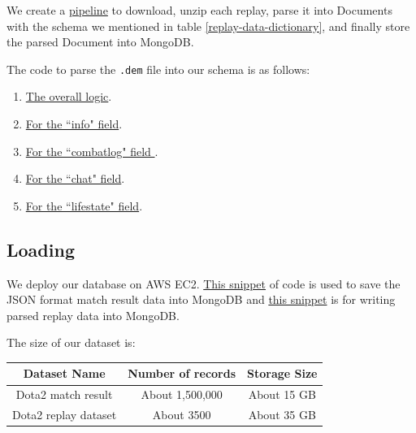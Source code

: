 \documentclass{article}
\newcommand{\codeinline}[1]{
    \texttt{#1}
}
\begin{document}
We create a \href{https://github.com/Vopaaz/big-data-psg-lgd/blob/9916e0a5a95245062d110446eb4014312087ef9e/src/main/java/FetchStore/ValveAPI.java#L389-L418}{pipeline} to download, unzip each replay, parse it into Documents with the schema we mentioned in table \ref{replay-data-dictionary}, and finally store the parsed Document into MongoDB.

The code to parse the \codeinline{.dem} file into our schema is as follows:

\begin{enumerate}
\item \href{https://github.com/Vopaaz/big-data-psg-lgd/blob/master/src/main/java/ParseReplay/ParseReplayExecutor.java}{The overall logic}.
\item \href{https://github.com/Vopaaz/big-data-psg-lgd/blob/master/src/main/java/ParseReplay/Info.java}{For the ``info" field}.
\item \href{https://github.com/Vopaaz/big-data-psg-lgd/blob/master/src/main/java/ParseReplay/Combatlog.java}{For the ``combatlog" field }.
\item \href{https://github.com/Vopaaz/big-data-psg-lgd/blob/master/src/main/java/ParseReplay/Chat.java}{For the ``chat" field}.
\item \href{https://github.com/Vopaaz/big-data-psg-lgd/blob/master/src/main/java/ParseReplay/Lifestate.java}{For the ``lifestate" field}.
\end{enumerate}

\subsection{Loading}
We deploy our database on AWS EC2.
\href{https://github.com/Vopaaz/big-data-psg-lgd/blob/a9a285e0e29c0d9e56b41994875df830c7e7b51b/src/main/java/FetchStore/ValveAPI.java#L164-L178}{This snippet} of code is used to save the JSON format match result data into MongoDB and \href{https://github.com/Vopaaz/big-data-psg-lgd/blob/a9a285e0e29c0d9e56b41994875df830c7e7b51b/src/main/java/FetchStore/ValveAPI.java#L406-L420}{this snippet} is for writing parsed replay data into MongoDB.

The size of our dataset is:

\begin{table}[H]
\centering
\begin{tabular}{|c|c|c|}
\hline
Dataset Name & Number of records & Storage Size \\
\hline
Dota2 match result & About 1,500,000 & About 15 GB \\
\hline
Dota2 replay dataset & About 3500 & About 35 GB \\
\hline
\end{tabular}
\end{table}
\end{document}
